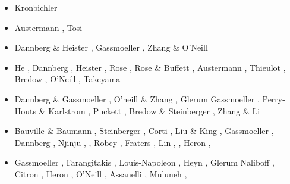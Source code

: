 \begin{itemize}
\begin{scriptsize}
\begin{itemize}
\item[\twothousandtwelve] Kronbichler \etal \cite{krhb12}
\item[\twothousandfifteen] Austermann \etal \cite{aupm15}, Tosi \etal \cite{tosn15}
\item[\twothousandsixteen] Dannberg \& Heister \cite{dahe16}, Gassmoeller \etal \cite{gadb16}, 
                           Zhang \& O'Neill \cite{zhon16}
\item[\twothousandseventeen] He \etal \cite{hepb17}, Dannberg \etal \cite{daef17}, 
                             Heister \etal \cite{hedg17}, Rose \etal \cite{robh17}, 
                             Rose \& Buffett \cite{robu17}, Austermann \etal \cite{aumh17},
                             Thieulot \cite{thie17}, Bredow \etal \cite{brsg17}, 
                             O'Neill \etal \cite{onmz17}, Takeyama \etal \cite{tasm17}
\item[\twothousandeighteen] Dannberg \& Gassmoeller \cite{daga18}, O'neill \& Zhang \cite{onzh18}, 
                            Glerum \etal \cite{gltf18}
                            Gassmoeller \etal \cite{galh18}, 
                            Perry-Houts \& Karlstrom \cite{peka18}, Puckett \etal \cite{puth18},
                            Bredow \& Steinberger \cite{brst18b}, Zhang \& Li \cite{zhli18}
\item[\twothousandnineteen] Bauville \& Baumann \cite{baba19}, Steinberger \etal \cite{stbl19}, 
                            Corti \etal \cite{cocf19}, Liu \& King \cite{liki19}, 
                            Gassmoeller \etal \cite{galb19}, Dannberg \etal \cite{dagg19},
                            Njinju \etal \cite{njas19}, \textcite{sepg19}, 
                            Robey \etal \cite{ropu19}, Fraters \etal \cite{frtv19,frbt19},
                            Lin \etal \cite{lixs19}, \textcite{hepm19}, Heron \etal \cite{heps19}, 
                            \textcite{perr19}
\item[\twothousandtwenty] Gassmoeller \etal \cite{gadb20}, Farangitakis \etal \cite{fahm20}, 
                          Louis-Napoleon \etal \cite{logb20}, Heyn \etal \cite{hect20,hect20b}, 
                          Glerum \etal \cite{glbs20}
                          Naliboff \etal \cite{nagb20}, Citron \etal \cite{cilw20},
                          Heron \etal \cite{hemn20}, O'Neill \etal \cite{onlw20}, 
                          Assanelli \etal \cite{aslr20}, Muluneh \etal \cite{mubi20},

\end{itemize}
\end{scriptsize}
\end{itemize}
